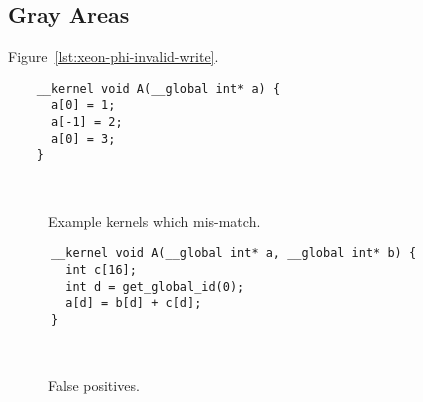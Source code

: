 \subsection{Gray Areas}

Figure~\ref{lst:xeon-phi-invalid-write}.

\newsavebox{\XeonPhiInvalidWrite}
\begin{lrbox}{\XeonPhiInvalidWrite}
  \hspace{1.5em}
  \begin{lstlisting}
    __kernel void A(__global int* a) {
      a[0] = 1;
      a[-1] = 2;
      a[0] = 3;
    }
  \end{lstlisting}
\end{lrbox}

\begin{figure}
  \centering %
  \\%
  \caption{Example kernels which mis-match.}%
  \label{lst:gray-areas}%
\end{figure}


\newsavebox{\UninitRead}
\begin{lrbox}{\UninitRead}
  \hspace{1.5em}
  \begin{lstlisting}
      __kernel void A(__global int* a, __global int* b) {
        int c[16];
        int d = get_global_id(0);
        a[d] = b[d] + c[d];
      }
  \end{lstlisting}
\end{lrbox}

\begin{figure}
  \centering %
  \\%
  \caption{False positives.}%
  \label{lst:uninit-read}%
\end{figure}
